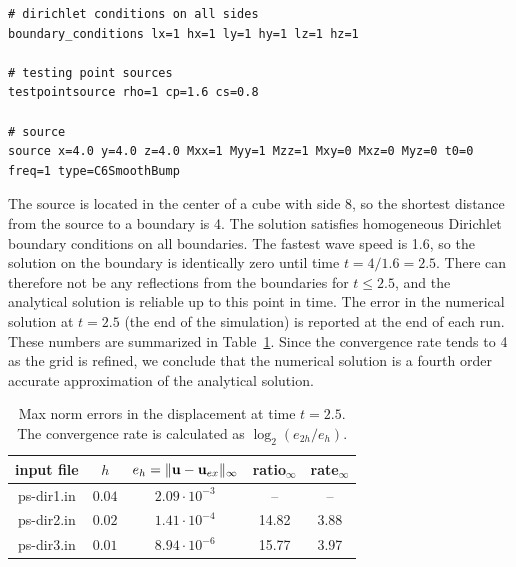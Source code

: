 \documentclass[11pt]{report}
\newcommand{\ub}{{\bf u}}
\begin{document}
{\begin{verbatim}
# dirichlet conditions on all sides
boundary_conditions lx=1 hx=1 ly=1 hy=1 lz=1 hz=1

# testing point sources
testpointsource rho=1 cp=1.6 cs=0.8

# source
source x=4.0 y=4.0 z=4.0 Mxx=1 Myy=1 Mzz=1 Mxy=0 Mxz=0 Myz=0 t0=0 freq=1 type=C6SmoothBump
\end{verbatim}

The source is located in the center of a cube with side 8, so the shortest distance from the source
to a boundary is 4.  The solution satisfies homogeneous Dirichlet boundary conditions on all
boundaries. The fastest wave speed is 1.6, so the solution on the boundary is identically zero until
time $t=4/1.6 = 2.5$. There can therefore not be any reflections from the boundaries for $t\leq
	2.5$, and the analytical solution is reliable up to this point in time. The error in the numerical
solution at $t=2.5$ (the end of the simulation) is reported at the end of each run. These numbers
are summarized in Table~\ref{tab:point-source}. Since the convergence rate tends to 4 as the grid is
refined, we conclude that the numerical solution is a fourth order accurate approximation of the
analytical solution.
\begin{table}
	\begin{center}
		\begin{tabular}{| c | c | c | c  | c | }
			\hline
			input file & $h$    & $e_h=\| \ub - \ub_{ex}\|_\infty$ & ratio$_\infty$ & rate$_\infty$ \\ \hline
			ps-dir1.in & $0.04$ & $2.09\cdot 10^{-3}$              & --             & --            \\ \hline
			ps-dir2.in & $0.02$ & $1.41\cdot 10^{-4}$              & 14.82          & 3.88          \\ \hline
			ps-dir3.in & $0.01$ & $8.94\cdot 10^{-6}$              & 15.77          & 3.97          \\ \hline
		\end{tabular}
		\caption{Max norm errors in the displacement at time $t=2.5$. The convergence rate is calculated as
			$\log_2(e_{2h}/e_h)$. }
		\label{tab:point-source}
	\end{center}
\end{table}

}
\end{document}
